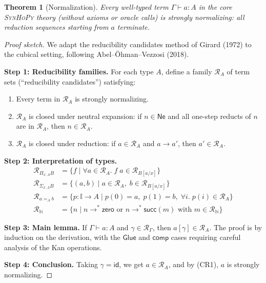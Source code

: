 \documentclass[11pt,a4paper]{report}
\theoremstyle{definition}
\theoremstyle{plain}
\newtheorem{theorem}[definition]{Theorem}
\newcommand{\Nat}{\mathbb{N}}
\newcommand{\interval}{\mathbb{I}}
\newcommand{\comp}{\mathsf{comp}}
\newcommand{\Glue}{\mathsf{Glue}}
\newcommand{\synhopy}{\textsc{SynHoPy}}
\begin{document}
\begin{theorem}[Normalization]
\label{thm:normalization}
Every well-typed term $\Gamma \vdash a : A$ in the core \synhopy{} theory
(without axioms or oracle calls) is strongly normalizing: all reduction
sequences starting from $a$ terminate.
\end{theorem}
\begin{proof}[Proof sketch]
We adapt the reducibility candidates method of Girard (1972) to the cubical
setting, following Abel--\"Ohman--Vezzosi (2018).

\textbf{Step 1: Reducibility families.}
For each type $A$, define a family $\mathcal{R}_A$ of term sets (``reducibility
candidates'') satisfying:
\begin{enumerate}
  \item[(CR1)] Every term in $\mathcal{R}_A$ is strongly normalizing.
  \item[(CR2)] $\mathcal{R}_A$ is closed under neutral expansion: if
    $n \in \mathsf{Ne}$ and all one-step reducts of $n$ are in $\mathcal{R}_A$,
    then $n \in \mathcal{R}_A$.
  \item[(CR3)] $\mathcal{R}_A$ is closed under reduction: if $a \in \mathcal{R}_A$
    and $a \to a'$, then $a' \in \mathcal{R}_A$.
\end{enumerate}

\textbf{Step 2: Interpretation of types.}
\begin{align}
  \mathcal{R}_{\Pi_{x:A}B} &= \{f \mid \forall a \in \mathcal{R}_A.\;
    f\;a \in \mathcal{R}_{B[a/x]}\} \\
  \mathcal{R}_{\Sigma_{x:A}B} &= \{(a, b) \mid a \in \mathcal{R}_A,\;
    b \in \mathcal{R}_{B[a/x]}\} \\
  \mathcal{R}_{a =_A b} &= \{p : \interval \to A \mid p(0) = a,\; p(1) = b,\;
    \forall i.\; p(i) \in \mathcal{R}_A\} \\
  \mathcal{R}_\Nat &= \{n \mid n \to^* \mathsf{zero} \text{ or }
    n \to^* \mathsf{succ}(m) \text{ with } m \in \mathcal{R}_\Nat\}
\end{align}

\textbf{Step 3: Main lemma.}
If $\Gamma \vdash a : A$ and $\gamma \in \mathcal{R}_\Gamma$, then
$a[\gamma] \in \mathcal{R}_A$.  The proof is by induction on the derivation,
with the $\Glue$ and $\comp$ cases requiring careful analysis of the Kan
operations.

\textbf{Step 4: Conclusion.}
Taking $\gamma = \mathsf{id}$, we get $a \in \mathcal{R}_A$, and by (CR1),
$a$ is strongly normalizing.
\end{proof}
\end{document}
